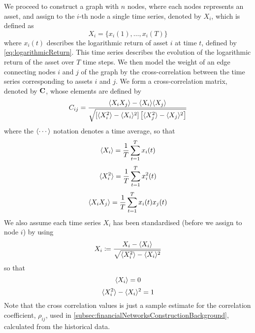 We proceed to construct a graph with $n$ nodes, where each nodes represents an asset, and assign to the $i$-th node a single time series, denoted by $X_{i}$, which is defined as
\begin{equation}
	\label{eq:singleTimeSeries}
	X_{i} = \{x_{i}(1),\dots,x_{i}(T)\}
\end{equation}
where $x_{i}(t)$ describes the logarithmic return of asset $i$ at time $t$, defined by \cref{eq:logarithmicReturn}.
This time series describes the evolution of the logarithmic return of the asset over $T$ time steps.
We then model the weight of an edge connecting nodes $i$ and $j$ of the graph by the cross-correlation between the time series corresponding to assets $i$ and $j$.
We form a cross-correlation matrix, denoted by $\mathbf C$, whose elements are defined by
\begin{equation}
	\label{eq:crossCorrelationMatrix}
	C_{ij} = \frac{\langle X_{i} X_{j}\rangle - \langle X_{i}\rangle \langle X_{j}\rangle}{\sqrt{\left[ \langle X_{i}^{2}\rangle - \langle X_{i}\rangle^{2} \right] \left[ \langle X_{j}^{2}\rangle - \langle X_{j}\rangle^{2} \right]}}
\end{equation}
where the $\langle\cdots\rangle$ notation denotes a time average, so that
\begin{equation}
	\label{eq:temporalMean}
	\langle X_{i}\rangle = \frac{1}{T} \sum_{t=1}^{T} x_{i}(t)
\end{equation}
\begin{equation}
	\label{eq:temporalMeanSquare}
	\langle X_{i}^{2}\rangle = \frac{1}{T} \sum_{t=1}^{T} x_{i}^{2}(t)
\end{equation}
\begin{equation}
	\label{eq:temporalMeanProduct}
	\langle X_{i}X_{j}\rangle = \frac{1}{T} \sum_{t=1}^{T} x_{i}(t)x_{j}(t)
\end{equation}
We also assume each time series $X_{i}$ has been standardised (before we assign to node $i$) by using
\begin{equation}
	\label{eq:standardiseTimeSeries}
	X_{i} \coloneqq \frac{X_{i} - \langle X_{i}\rangle}{\sqrt{\langle X_{i}^{2}\rangle - \langle X_{i}\rangle^{2}}}
\end{equation}
so that
\begin{equation}
	\label{eq:zeroTemporalMean}
	\langle X_{i}\rangle = 0
\end{equation}
\begin{equation}
	\label{eq:unitTemporalVariance}
	\langle X_{i}^{2}\rangle - \langle X_{i}\rangle^{2} = 1
\end{equation}
Note that the cross correlation values is just a sample estimate for the correlation coefficient, $\rho_{ij}$, used in \cref{subsec:financialNetworksConstructionBackground}, calculated from the historical data.


